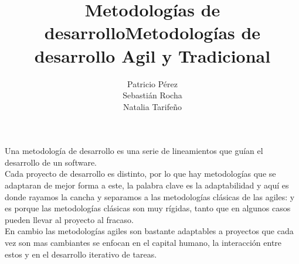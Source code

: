 \documentclass[a4paper,11pt]{report}
\begin{document}
\title{Metodologías de desarrollo}
\author{Patricio Pérez\\
        Sebastián Rocha\\
        Natalia Tarifeño}
\maketitle

\title {Metodologías de desarrollo Agil y Tradicional}

Una metodología de desarrollo es una serie de lineamientos que guían el desarrollo de un software.\\
Cada proyecto de desarrollo es distinto, por lo que hay metodologías que se adaptaran de mejor forma a este, la palabra clave es la adaptabilidad y aquí es donde rayamos la cancha y separamos a las metodologías clásicas de las agiles: y es porque las metodologías clásicas son muy rígidas, tanto que en algunos casos pueden llevar al proyecto al fracaso.\\
En cambio las metodologías agiles son bastante adaptables a proyectos que cada vez son mas cambiantes se enfocan en el capital humano, la interacción entre estos y en el desarrollo iterativo de tareas.
\end{document}
